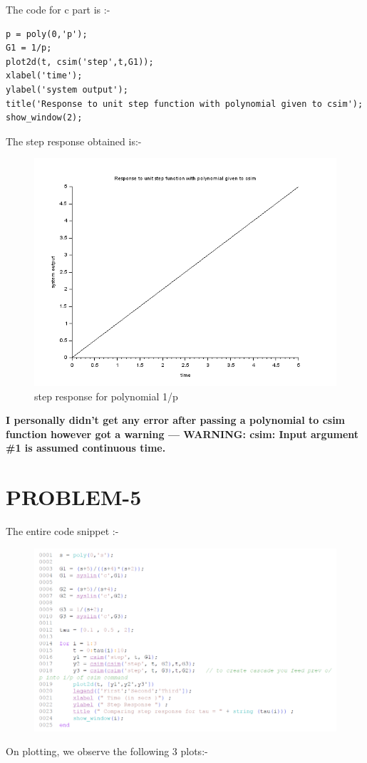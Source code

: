\documentclass[12pt]{article}
\begin{document}
The code for c part is :-
\begin{verbatim}
p = poly(0,'p');
G1 = 1/p;
plot2d(t, csim('step',t,G1));
xlabel('time');
ylabel('system output');
title('Response to unit step function with polynomial given to csim');
show_window(2);
    \end{verbatim}   
 The step response obtained is:-
    \begin{figure}[H]
        \centering
        \includegraphics[scale=0.8]{q4_c.png}
        \caption{step response for polynomial 1/p}
        \label{fig:my_label}
    \end{figure}

\textbf{I personally didn't get any error after passing a polynomial to csim function however got a warning --- WARNING: csim: Input argument \#1 is assumed continuous time.}

\section{PROBLEM-5}
The entire code snippet :-
    \begin{figure}[H]
        \centering
        \includegraphics[scale=0.8]{q5_code.png}
    \end{figure}
    On plotting, we observe the following 3 plots:-
    
\end{document}
